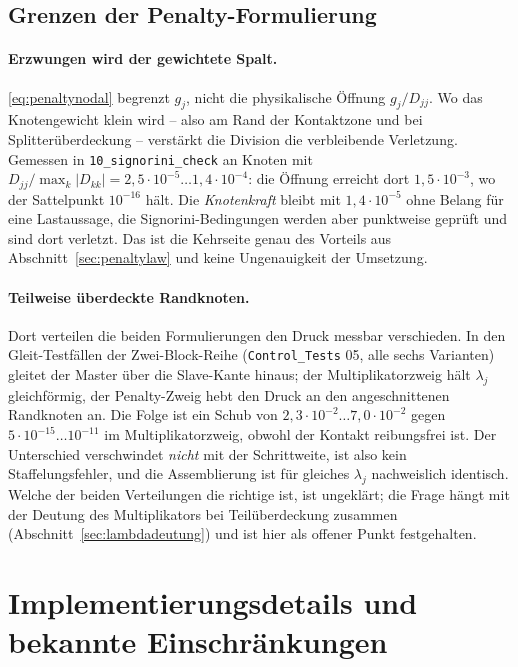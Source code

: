 \documentclass[a4paper,11pt]{article}
\def\tilde#1{#1}%
\newcommand{\file}[1]{\texttt{\small #1}}
\let\stdsection\section
\renewcommand{\section}{\clearpage\stdsection}
\begin{document}
\subsection{Grenzen der Penalty-Formulierung}
\label{sec:penaltylimits}

\paragraph{Erzwungen wird der gewichtete Spalt.} \eqref{eq:penaltynodal} begrenzt $\tilde g_j$,
nicht die physikalische Öffnung $\tilde g_j/\tilde D_{jj}$. Wo das Knotengewicht klein wird --
also am Rand der Kontaktzone und bei Splitterüberdeckung -- verstärkt die Division die
verbleibende Verletzung. Gemessen in \file{10\_signorini\_check} an Knoten mit
$\tilde D_{jj}/\max_k|\tilde D_{kk}|=2{,}5\cdot10^{-5}\ldots1{,}4\cdot10^{-4}$: die Öffnung
erreicht dort $1{,}5\cdot10^{-3}$, wo der Sattelpunkt $10^{-16}$ hält. Die \emph{Knotenkraft}
bleibt mit $1{,}4\cdot10^{-5}$ ohne Belang für eine Lastaussage, die Signorini-Bedingungen werden
aber punktweise geprüft und sind dort verletzt. Das ist die Kehrseite genau des Vorteils aus
Abschnitt~\ref{sec:penaltylaw} und keine Ungenauigkeit der Umsetzung.

\paragraph{Teilweise überdeckte Randknoten.} Dort verteilen die beiden Formulierungen den Druck
messbar verschieden. In den Gleit-Testfällen der Zwei-Block-Reihe
(\file{Control\_Tests} 05, alle sechs Varianten) gleitet der Master über die Slave-Kante hinaus;
der Multiplikatorzweig hält $\lambda_j$ gleichförmig, der Penalty-Zweig hebt den Druck an den
angeschnittenen Randknoten an. Die Folge ist ein Schub von $2{,}3\cdot10^{-2}\ldots7{,}0\cdot
10^{-2}$ gegen $5\cdot10^{-15}\ldots10^{-11}$ im Multiplikatorzweig, obwohl der Kontakt
reibungsfrei ist. Der Unterschied verschwindet \emph{nicht} mit der Schrittweite, ist also kein
Staffelungsfehler, und die Assemblierung ist für gleiches $\lambda_j$ nachweislich identisch.
Welche der beiden Verteilungen die richtige ist, ist ungeklärt; die Frage hängt mit der Deutung
des Multiplikators bei Teilüberdeckung zusammen (Abschnitt~\ref{sec:lambdadeutung}) und ist hier
als offener Punkt festgehalten.

\section{Implementierungsdetails und bekannte Einschränkungen}
\label{sec:implnotes}
\end{document}
